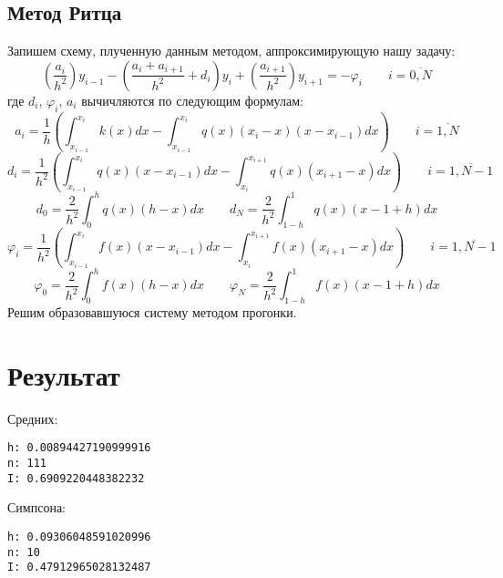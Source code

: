 \documentclass[12pt]{article}
\makeatletter
\newcommand{\verbatimfont}[1]{\renewcommand{\verbatim@font}{\ttfamily#1}}
\makeatother
\begin{document}
	\subsection*{Метод Ритца}
		Запишем схему, плученную данным методом, аппроксимирующую нашу задачу:
		$$
			\left( \dfrac{a_i}{h^2} \right) y_{i-1} - 
			\left( \dfrac{a_{i} + a_{i+1}}{h^2} + d_i \right) y_i +
			\left( \frac{ a_{i+1}}{h^2} \right) y_{i+1} =
			-\varphi_i 
			\qquad
			i = \overline{0, N}
		$$
		где $d_i$, $\varphi_i$, $a_i$ вычичляются по следующим формулам:
		$$
			a_{i} =
			\dfrac{1}{h}
			\left(
				\int_{x_{i-1}}^{x_i} k(x)dx -
				\int_{x_{i-1}}^{x_i} q(x)(x_i-x)(x-x_{i-1})dx 
			\right) 
			\qquad 
			i = \overline{1,N}
		$$
		$$
			d_i=
			\frac{1}{h^2}
			\left(
				\int_{x_{i-1}}^{x_i} q(x)(x-x_{i-1})dx -
				\int_{x_{i}}^{x_{i+1}} q(x)(x_{i+1} - x)dx 
			\right)
			\qquad
			i = \overline{1,N-1}
		$$
		$$
			d_0=
			\frac{2}{h^2}
			\int_{0}^{h}q(x)(h-x)dx
			\qquad				
			d_N=
			\frac{2}{h^2}
			\int_{1-h}^{1}q(x)(x-1+h)dx
		$$
		$$
			\varphi_i=
			\frac{1}{h^2}
			\left(
				\int_{x_{i-1}}^{x_i}f(x)(x - x_{i-1})dx -
				\int_{x_{i}}^{x_{i+1}}f(x)(x_{i+1} - x)dx 
			\right)
			\qquad
			 i= \overline{1,N-1}
		$$
		$$
			\varphi_0=
			\frac{2}{h^2}
			\int_{0}^{h}f(x)(h - x)dx
			\qquad			
			\varphi_N=
			\frac{2}{h^2}
			\int_{1-h}^{1}
			f(x)(x - 1 + h)dx
		$$
		Решим образовавшуюся систему методом прогонки.
	
\section*{Результат}
Средних:
\verbatimfont{\small}
\begin{verbatim}
h: 0.00894427190999916
n: 111
I: 0.6909220448382232
\end{verbatim}
Симпсона:
\verbatimfont{\small}
\begin{verbatim}
h: 0.09306048591020996
n: 10
I: 0.47912965028132487
\end{verbatim}
\newpage
\end{document}
